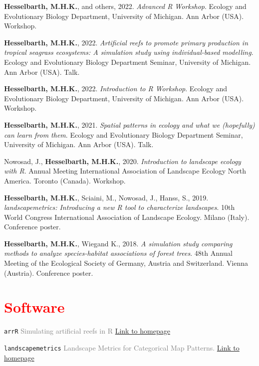 \documentclass[hidelinks]{report}
\begin{document}
\begin{hangparas}{7.5mm}{1}

\textbf{Hesselbarth, M.H.K.}, and others, 2022. \textit{Advanced R Workshop}. Ecology and Evolutionary Biology Department, University of Michigan. Ann Arbor (USA). Workshop.

\textbf{Hesselbarth, M.H.K.}, 2022. \textit{Artificial reefs to promote primary production in tropical seagrass ecosystems: A simulation study using individual-based modelling}. Ecology and Evolutionary Biology Department Seminar, University of Michigan. Ann Arbor (USA). Talk.

\textbf{Hesselbarth, M.H.K.}, 2022. \textit{Introduction to R Workshop}. Ecology and Evolutionary Biology Department, University of Michigan. Ann Arbor (USA). Workshop.

\textbf{Hesselbarth, M.H.K.}, 2021. \textit{Spatial patterns in ecology and what we (hopefully) can learn from them}. Ecology and Evolutionary Biology Department Seminar, University of Michigan. Ann Arbor (USA). Talk.

Nowosad, J., \textbf{Hesselbarth, M.H.K.}, 2020. \textit{Introduction to landscape ecology with R}. Annual Meeting International Association of Landscape Ecology North America. Toronto (Canada). Workshop.

\textbf{Hesselbarth, M.H.K.}, Sciaini, M., Nowosad, J., Hanss, S., 2019. \textit{landscapemetrics: Introducing a new R tool to characterize landscapes}. 10th World Congress International Association of Landscape Ecology. Milano (Italy). Conference poster.

\textbf{Hesselbarth, M.H.K.}, Wiegand K., 2018. \textit{A simulation study comparing methods to analyze species-habitat associations of forest trees}. 48th Annual Meeting of the Ecological Society of Germany, Austria and Switzerland. Vienna (Austria). Conference poster.

\end{hangparas}


\section*{\textcolor{red}{Software} \sout{\hfill}}

\texttt{arrR} \textcolor{grey}{Simulating artificial reefs in R}
\hfill
\textcolor{blue}{\href{https://allgeier-lab.github.io/arrR/}{Link to homepage}}

\texttt{landscapemetrics} \textcolor{grey}{Landscape Metrics for Categorical Map Patterns.}
\hfill
\textcolor{blue}{\href{https://r-spatialecology.github.io/landscapemetrics/}{Link to homepage}}
\end{document}
